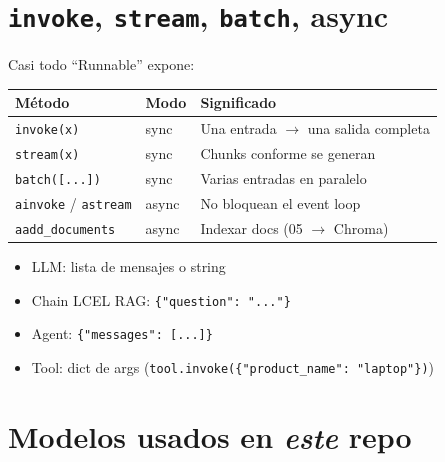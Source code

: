 \documentclass[11pt,a4paper]{article}
\begin{document}
\section{\texttt{invoke}, \texttt{stream}, \texttt{batch}, async}

Casi todo ``Runnable'' expone:

\begin{center}
\begin{tabular}{@{}llp{7.6cm}@{}}
\toprule
\textbf{Método} & \textbf{Modo} & \textbf{Significado} \\
\midrule
\texttt{invoke(x)} & sync & Una entrada $\to$ una salida completa \\
\texttt{stream(x)} & sync & Chunks conforme se generan \\
\texttt{batch([...])} & sync & Varias entradas en paralelo \\
\texttt{ainvoke} / \texttt{astream} & async & No bloquean el event loop \\
\texttt{aadd\_documents} & async & Indexar docs (05 $\to$ Chroma) \\
\bottomrule
\end{tabular}
\end{center}

\begin{lookup}[title=Shape del input]
\begin{itemize}[leftmargin=*,itemsep=1pt]
  \item LLM: lista de mensajes o string
  \item Chain LCEL RAG: \texttt{\{"question": "..."\}}
  \item Agent: \texttt{\{"messages": [...]\} }
  \item Tool: dict de args (\texttt{tool.invoke(\{"product\_name": "laptop"\})})
\end{itemize}
\end{lookup}

\section{Modelos usados en \emph{este} repo}
\end{document}

